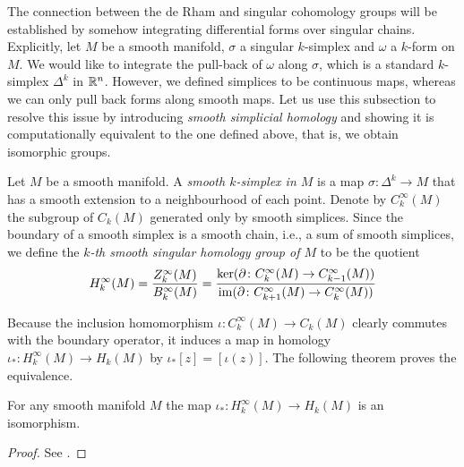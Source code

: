 \documentclass[a4paper, 12pt]{article}
\begin{document}
The connection between the de Rham and singular cohomology groups will be
established by somehow integrating differential forms over singular chains.
Explicitly, let $M$ be a smooth manifold, $\sigma$ a singular $k$-simplex and
$\omega$ a $k$-form on $M$.  We would like to integrate the pull-back of
$\omega$ along $\sigma$, which is a standard $k$-simplex $\Delta^k$ in $\mathbb{R}^n$.
However, we defined simplices to be continuous maps, whereas we can only pull
back forms along smooth maps.
Let us use this subsection to resolve this issue by introducing \emph{smooth
simplicial homology} and showing it is computationally equivalent to the one
defined above, that is, we obtain isomorphic groups.

\begin{definition}
    Let $M$ be a smooth manifold.
    A \emph{smooth $k$-simplex in $M$} is a map $\sigma \colon \Delta^k \to M$
    that has a smooth extension to a neighbourhood of each point.
    Denote by $C_k^\infty(M)$ the subgroup of $C_k(M)$ generated only by smooth simplices.
    Since the boundary of a smooth simplex is a smooth chain, i.e., a sum of smooth simplices,
    we define the \emph{$k$-th smooth singular homology group of $M$} to be the quotient
    \[
        H_k^\infty(M)
        = \frac{Z_k^\infty(M)}{B_k^\infty(M)}
        = \frac{\ker(\partial \colon C_k^\infty(M) \to C_{k-1}^\infty(M))}{\operatorname{im}(\partial \colon C_{k+1}^\infty(M) \to C_k^\infty(M))}
    \]
\end{definition}
Because the inclusion homomorphism $\iota \colon C_k^\infty(M) \to C_k(M)$ clearly commutes with the boundary operator,
it induces a map in homology $\iota_* \colon H_k^\infty(M) \to H_k(M)$ by $\iota_*[z] = [\iota(z)]$.
The following theorem proves the equivalence.
\begin{theorem}
    For any smooth manifold $M$ the map $\iota_* \colon H_k^\infty(M) \to H_k(M)$ is an isomorphism.
\end{theorem}
\begin{proof}
    See \cite[Thm. 18.7 and Lemma 18.8]{Lee2012}.
\end{proof}
\end{document}
